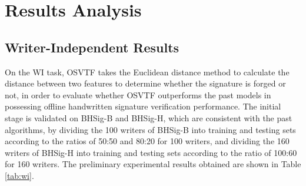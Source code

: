 \section{Results Analysis}

\subsection{Writer-Independent Results}

On the WI task, OSVTF takes the Euclidean distance method to calculate the distance between two features to determine whether the signature is forged or not, in order to evaluate whether OSVTF outperforms the past models in possessing offline handwritten signature verification performance. The initial stage is validated on BHSig-B and BHSig-H, which are consistent with the past algorithms, by dividing the 100 writers of BHSig-B into training and testing sets according to the ratios of 50:50 and 80:20 for 100 writers, and dividing the 160 writers of BHSig-H into training and testing sets according to the ratio of 100:60 for 160 writers. The preliminary experimental results obtained are shown in Table \ref{tab:wi}.

